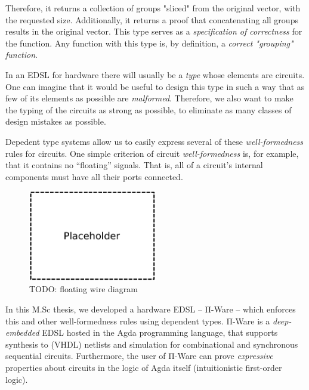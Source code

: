     Therefore, it returns a collection of groups "sliced" from the original vector, with the requested size.
    Additionally, it returns a proof that concatenating all groups results in the original vector.
    This type serves as a \emph{specification of correctness} for the function.
    Any function with this type is, by definition, a \emph{correct "grouping" function}.

    In an \ac{EDSL} for hardware there will usually be a \emph{type} whose elements are circuits.
    One can imagine that it would be useful to design this type
    in such a way that as few of its elements as possible are \emph{malformed}.
    Therefore, we also want to make the typing of the circuits as strong as possible,
    to eliminate as many classes of design mistakes as possible.


    Depedent type systems allow us to easily express several of these \emph{well-formedness} rules for circuits.
    One simple criterion of circuit \emph{well-formedness} is, for example, that it contains no ``floating'' signals.
    That is, all of a circuit's internal components must have all their ports connected. %

    \begin{figure}[h]
        \centerline{\includegraphics[width=0.5\textwidth]{imgs/floating-wire.pdf}}
        \caption{TODO: floating wire diagram \label{fig:floating-wire}}
    \end{figure}

    In this M.Sc thesis, we developed a hardware \ac{EDSL} -- Π-Ware -- which enforces this and other
    well-formedness rules using dependent types.
    Π-Ware is a \emph{deep-embedded} \ac{EDSL} hosted in the Agda programming language,
    that supports synthesis to (VHDL) netlists and simulation for combinational and synchronous sequential circuits.
    Furthermore, the user of Π-Ware can prove \emph{expressive} properties about circuits in the logic
    of Agda itself (intuitionistic first-order logic).

